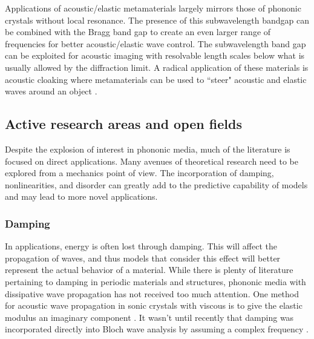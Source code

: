 \documentclass{article}
\begin{document}
Applications of acoustic/elastic metamaterials largely mirrors those of 
phononic crystals without local resonance. The presence of this subwavelength 
bandgap can be combined with the Bragg band gap to create an even 
larger range of frequencies for better acoustic/elastic wave control. The 
subwavelength band gap can be exploited for acoustic imaging with resolvable 
length scales below what is usually allowed by the diffraction limit. A radical 
application of these materials is acoustic cloaking where metamaterials can be 
used to ``steer" acoustic and elastic waves around an object \cite{norris11}.


\subsection{Active research areas and open fields}
Despite the explosion of interest in phononic media, much of the 
literature is focused on direct applications. Many avenues of theoretical 
research need to be explored from a mechanics point of view. The incorporation 
of damping, nonlinearities, and disorder can greatly add to the predictive 
capability of models and may lead to more novel applications. 


\subsubsection{Damping}
In applications, energy is often lost through damping. This will affect the 
propagation of waves, and thus models that consider this effect will better 
represent the actual behavior of a material. While there is plenty of 
literature pertaining to damping in periodic materials and structures, phononic 
media with dissipative wave propagation has not received too much attention. 
One method for acoustic wave propagation in sonic crystals with 
viscous is to give the elastic modulus an imaginary component \cite{hussein14}. 
It wasn't until recently that damping was incorporated directly into 
Bloch wave analysis by assuming a complex frequency \cite{hussein10}.
\end{document}
